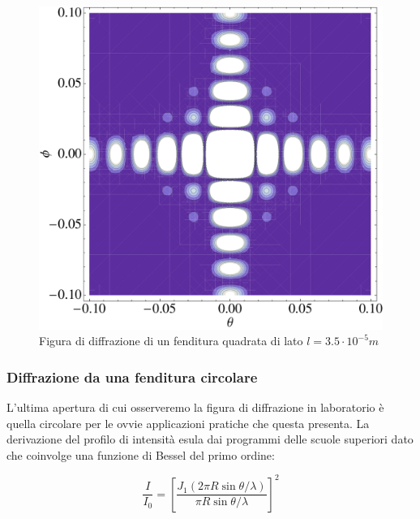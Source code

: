 \documentclass[a4paper,10pt,oneside]{article}
\begin{document}
\begin{figure}[H]
 \centering
 \includegraphics[width=\textwidth]{./Immagini/diffrazione3.pdf}
 \caption{Figura di diffrazione di un fenditura quadrata di lato $l=3.5\cdot 10^{-5}m$}
 \label{fig:diffrazione3}
\end{figure}




\subsubsection{Diffrazione da una fenditura circolare}


L'ultima apertura di cui osserveremo la figura di diffrazione in laboratorio è quella circolare per le ovvie applicazioni pratiche che questa presenta. La derivazione del profilo di intensità esula dai programmi delle scuole superiori dato che coinvolge una funzione di Bessel del primo ordine:

\begin{equation}
 \frac{I}{I_0}=\left[\frac{J_1(2\pi R\sin\theta/\lambda)}{\pi R \sin\theta/\lambda}\right]^2
\end{equation}
\end{document}
